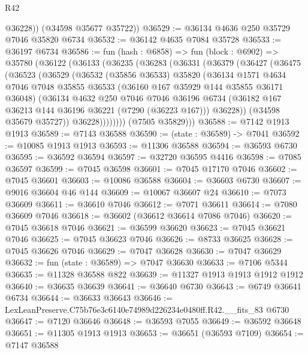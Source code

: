\begin{lexlean}{R42}
\begin{coremodule}
{          @36228))
      (@34598 @35677 @35722))
@36529 := @36134 @4636 @250 @35729 @7046 @35820 @6734
@36532 := @36142 @4635 @7084 @35728
@36533 := @36197 @6734
@36586 := fun (hash : @6858) =>
  fun (block : @6902) =>
  @35780
    (@36122
      (@36133
        (@36235
          (@36283
            (@36331
              (@36379
                (@36427
                  (@36475
                    (@36523
                      (@36529
                        (@36532
                          (@35856 @36533)
                          @35820
                          (@36134
                            @1571
                            @4634
                            @7046
                            @7048
                            @35855
                            @36533
                            (@36160 @167 @35929 @144 @35855 @36171 @36048)
                            (@36134
                              @4632
                              @250
                              @7046
                              @7046
                              @36196
                              @6734
                              (@36182 @167 @36213 @144 @36196 @36221 (@7290 (@36223 @167)))
                              @36228))
                          (@34598 @35679 @35727))
                        @36228))))))))
        (@7505 @35829)))
@36588 := @7142 @1913 @1913
@36589 := @7143 @36588
@36590 := (state : @36589) -> @7041
@36592 := @10085 @1913 @1913
@36593 := @11306 @36588
@36594 := @36593 @6730
@36595 := @36592 @36594
@36597 := @32720 @36595 @4416
@36598 := @7085 @36597
@36599 := @7045 @36598
@36601 := @7045 @17170 @7046
@36602 := @7045 @36601
@36603 := @10086 @36588
@36604 := @36603 @6730
@36607 := @9016 @36604 @46 @144
@36609 := @10067 @36607 @24
@36610 := @7073 @36609
@36611 := @36610 @7046
@36612 := @7071 @36611
@36614 := @7080 @36609 @7046
@36618 := @36602 (@36612 @36614 @7086 @7046)
@36620 := @7045 @36618 @7046
@36621 := @36599 @36620
@36623 := @7045 @36621 @7046
@36625 := @7045 @36623 @7046
@36626 := @8733 @36625
@36628 := @7045 @36626 @7046
@36629 := @7047 @36628
@36630 := @7047 @36629
@36632 := fun (state : @36589) => @7047 @36630
@36633 := @7106 @5344
@36635 := @11328 @36588 @822
@36639 := @11327 @1913 @1913 @1912 @1912
@36640 := @36635 @36639
@36641 := @36640 @6730
@36643 := @6749 @36641 @6734
@36644 := @36633 @36643
@36646 := LexLeanPreserve.C75b76e3c6140e74989d226234e0480ff.R42.__fits_83 @6730
@36647 := @7120 @36646
@36648 := @36593 @7055
@36649 := @36592 @36648
@36651 := @11305 @1913 @1913
@36653 := @36651 (@36593 @7109)
@36654 := @7147 @36588
}
\end{coremodule}
\end{lexlean}
